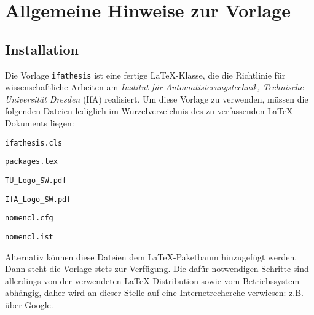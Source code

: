 
\chapter{Allgemeine Hinweise zur Vorlage}
\label{sec:AllgemeineHinweiseZurVorlage}

\section{Installation}
\label{sec:install}

Die Vorlage \verb-ifathesis- ist eine fertige \LaTeX-Klasse, die die Richtlinie für wissenschaftliche Arbeiten am \emph{Institut für Automatisierungstechnik, Technische Universität Dresden} (IfA) realisiert. Um diese Vorlage zu verwenden, müssen die folgenden Dateien lediglich im Wurzelverzeichnis des zu verfassenden \LaTeX-Dokuments liegen:
\begin{compactitem}
  \item \verb-ifathesis.cls-
  \item \verb-packages.tex-
  \item \verb-TU_Logo_SW.pdf-
  \item \verb-IfA_Logo_SW.pdf-
  \item \verb-nomencl.cfg-
  \item \verb-nomencl.ist-
\end{compactitem}
Alternativ können diese Dateien dem \LaTeX-Paketbaum hinzugefügt werden. Dann steht die Vorlage stets zur Verfügung. Die dafür notwendigen Schritte sind allerdings von der verwendeten \LaTeX-Distribution sowie vom Betriebssystem abhängig, daher wird an dieser Stelle auf eine Internetrecherche verwiesen: \href{http://www.google.de/search?sourceid=chrome&ie=UTF-8&q=latex+install+packages}{z.B. über Google.}

